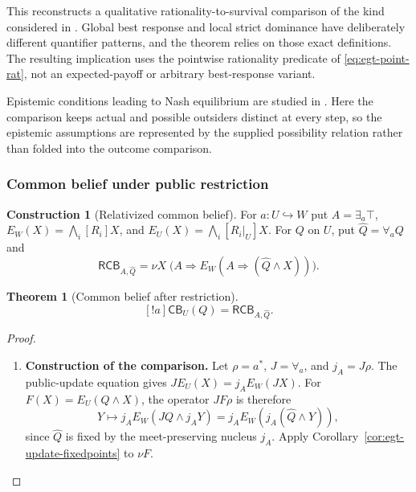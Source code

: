 \documentclass[11pt,a4paper]{article}
\numberwithin{equation}{section}
\newtheorem{theorem}{Theorem}[section]
\theoremstyle{definition}
\newtheorem{construction}[construction]{Construction}
\theoremstyle{remark}
\theoremstyle{plain}
\begin{document}
This reconstructs a qualitative rationality-to-survival comparison
of the kind considered in \citet{ZvesperApt2010}. Global best
response and local strict dominance have deliberately different
quantifier patterns, and the theorem relies on those exact definitions.
The resulting implication uses the pointwise rationality predicate
of \eqref{eq:egt-point-rat}, not an expected-payoff or arbitrary
best-response variant.

Epistemic conditions leading to Nash equilibrium are studied in
\citet{AumannBrandenburger1995}. Here the comparison keeps actual
and possible outsiders distinct at every step, so the epistemic
assumptions are represented by the supplied possibility relation
rather than folded into the outcome comparison.

\subsubsection{Common belief under public restriction}
\label{sec:egt-relativized-common-belief}

\begin{construction}[Relativized common belief]
For $a:U\hookrightarrow W$ put $A=\exists_a\top$,
$E_W(X)=\bigwedge_i[R_i]X$, and
$E_U(X)=\bigwedge_i[R_i|_U]X$. For $Q$ on $U$, put
$\widehat Q=\forall_aQ$ and
\[
 \mathsf{RCB}_{A,\widehat Q}
 =\nu X\;\bigl(A\Rightarrow
 E_W(A\Rightarrow(\widehat Q\wedge X))\bigr).
\]
\end{construction}

\begin{theorem}[Common belief after restriction]
\label{thm:egt-common-belief-update}
\begin{equation}\label{eq:egt-common-belief-update}
 [!a]\mathsf{CB}_U(Q)=\mathsf{RCB}_{A,\widehat Q}.
\end{equation}
\end{theorem}
\begin{proof}
\leavevmode
\begin{enumerate}[label=\textup{(\arabic*)},leftmargin=*,itemsep=4pt,topsep=3pt]
  \item \textbf{Construction of the comparison.} Let $\rho=a^*$, $J=\forall_a$, and $j_A=J\rho$. The public-update equation gives $JE_U(X)=j_AE_W(JX)$. For $F(X)=E_U(Q\wedge X)$, the operator $JF\rho$ is therefore
\[
 Y\longmapsto j_AE_W(JQ\wedge j_AY)
 =j_AE_W(j_A(\widehat Q\wedge Y)),
\]
since $\widehat Q$ is fixed by the meet-preserving nucleus $j_A$. Apply Corollary~\ref{cor:egt-update-fixedpoints} to $\nu F$.
\end{enumerate}
\end{proof}
\end{document}
